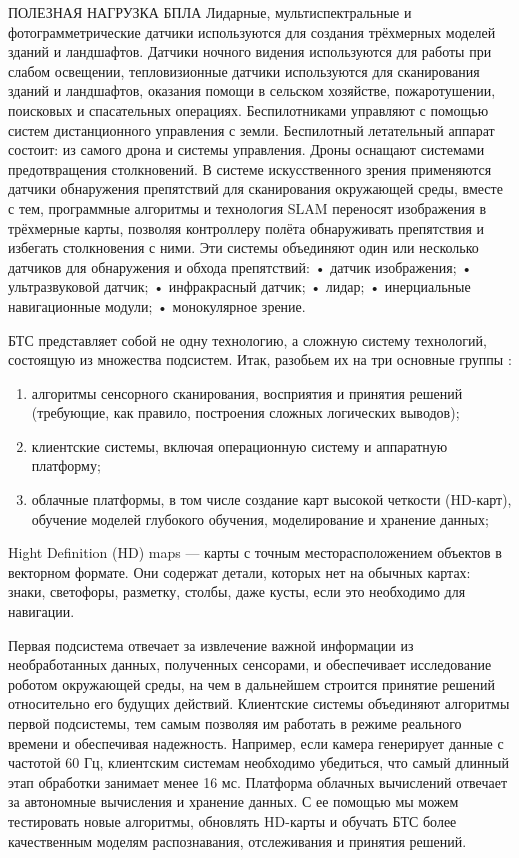 \documentclass[nir, och, master]{SCWorks}
\begin{document}
ПОЛЕЗНАЯ НАГРУЗКА БПЛА
Лидарные, мультиспектральные и фотограмметрические датчики используются для создания трёхмерных
моделей зданий и ландшафтов. Датчики ночного видения используются для работы при слабом освещении,
тепловизионные датчики используются для сканирования зданий и ландшафтов, оказания помощи в сельском хозяйстве, пожаротушении, поисковых и спасательных операциях.
Беспилотниками управляют с помощью систем дистанционного управления с земли. Беспилотный летательный аппарат состоит: из самого дрона и системы
управления.
Дроны оснащают системами предотвращения столкновений. В системе искусственного зрения применяются датчики обнаружения препятствий для сканирования окружающей среды, вместе с тем, программные
алгоритмы и технология SLAM переносят изображения
в трёхмерные карты, позволяя контроллеру полёта обнаруживать препятствия и избегать столкновения
с ними. Эти системы объединяют один или несколько
датчиков для обнаружения и обхода препятствий:
• датчик изображения;
• ультразвуковой датчик;
• инфракрасный датчик;
• лидар;
• инерциальные навигационные модули;
• монокулярное зрение.

БТС представляет собой не  одну технологию, а сложную систему технологий, состоящую из 
множества подсистем. Итак, разобьем их на три основные группы \cite{китайцв}: 
\begin{enumerate}
	\item алгоритмы сенсорного сканирования, восприятия и принятия решений 
	(требующие, как правило, построения сложных логических выводов); 
	\item клиентские системы, включая операционную систему и аппаратную платформу;
	\item облачные платформы, в том числе создание карт высокой четкости (HD-карт), 
	обучение моделей глубокого обучения, моделирование и хранение данных;
\end{enumerate}

Hight Definition (HD) maps — карты с точным месторасположением объектов в векторном формате. 
Они содержат детали, которых нет на обычных картах: знаки, светофоры, разметку, столбы, 
даже кусты, если это необходимо для навигации.

Первая подсистема отвечает за извлечение важной информации из необработанных данных, 
полученных сенсорами, и обеспечивает исследование роботом окружающей среды, на чем в 
дальнейшем строится принятие решений относительно его будущих действий. Клиентские системы 
объединяют алгоритмы первой подсистемы, тем самым позволяя им работать в режиме реального
времени и обеспечивая надежность. Например, если камера генерирует данные
с частотой 60 Гц, клиентским системам необходимо убедиться, что самый длинный этап 
обработки занимает менее 16 мс. Платформа облачных вычислений отвечает за автономные 
вычисления и хранение данных. С ее помощью мы можем тестировать новые алгоритмы, 
обновлять HD-карты и обучать БТС более качественным моделям распознавания, 
отслеживания и принятия решений.
  
\end{document}

